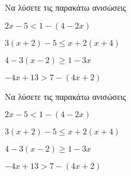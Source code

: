 Να λύσετε τις παρακάτω ανισώσεις
\begin{alist}
\item $ 2x-5<1-(4-2x) $
\item $ 3(x+2)-5\leq x+2(x+4) $
\item $ 4-3(x-2)\geq 1-3x $
\item $ -4x+13>7-(4x+2) $
\end{alist}
Να λύσετε τις παρακάτω ανισώσεις
\begin{alist}
\item $ 2x-5<1-(4-2x) $
\item $ 3(x+2)-5\leq x+2(x+4) $
\item $ 4-3(x-2)\geq 1-3x $
\item $ -4x+13>7-(4x+2) $
\end{alist}
